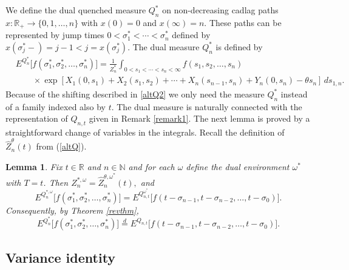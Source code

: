 \documentclass[11pt]{amsart}
\newtheorem{lemma}[theorem]{\sc Lemma}
\numberwithin{equation}{section}
\theoremstyle{remark}
\begin{document}
We define the dual quenched measure $Q^*_n$   on non-decreasing cadlag paths $x:{\mathbb{R}}_+\to \{0,1,\dots,n\}$ with $x(0)=0$ and $x(\infty)=n$. These paths can be represented by    jump times 
$0<\sigma^*_1<\dotsm<\sigma^*_{n}$ defined by $x(\sigma^*_j-)=j-1<j=x(\sigma^*_j)$.  The dual measure   $Q^*_n$  is defined by 
 \begin{equation}\label{Qstar}\begin{aligned} 
&E^{Q^*_{n}}\bigl[f(\sigma^*_1,\sigma^*_2,\dotsc,\sigma^*_{n})\bigr]  =\frac1{Z_n^*} 
\int_{0<s_1<\dotsm<s_n<\infty}  f(s_1, s_2,\dotsc, s_n)   \\[4pt]
&\qquad \times\exp\left[ X_1(0,s_1)+X_2(s_1,s_2)+\dotsm+ X_n(s_{n-1},s_{n})+Y_n(0,s_{n})-{\theta} s_{n}\right]
\,d{s_{1,n}}.  
\end{aligned}\end{equation}
Because of the shifting described in \eqref{altQ2} we only need 
the measure $Q^*_{n}$ instead of a family indexed also by $t$. 
 The dual measure is naturally connected  with the representation of  $Q_{n,t}$ given
 in Remark \ref{remark1}.   The    next lemma is proved by a straightforward  change of
 variables in the integrals.  {Recall the definition of $\widehat Z_n^{\theta}(t)$ from (\ref{altQ}).}
\begin{lemma}\label{LEMrev}  Fix $t\in{\mathbb{R}}$ and $n\in{\mathbb{N}}$  and for each
${\omega}$  define the dual environment ${\omega}^*$ 
with $T=t$.  
Then  $
Z_n^{*,{\omega}} =  \widehat Z_{n}^{{\theta}, {\omega}^*}(t), 
$
and 
\[  E^{Q^{*,{\omega}}_{n}}\bigl[f(\sigma^*_1,\sigma^*_2,\dotsc,\sigma^*_{n})  \bigr]
=    E^{Q_{n,t}^{{\omega}^*}}\bigl[ f(t-\sigma_{n-1},t-\sigma_{n-2},\dotsc,t-\sigma_{0})\bigr].    \]  
Consequently, by Theorem \ref{revthm}, 
\[
 E^{Q^{*}_{n}}\bigl[f(\sigma^*_1,\sigma^*_2,\dotsc,\sigma^*_{n}) \bigr]
   {\stackrel{d}{=}}   E^{Q_{n,t}}\bigl[f(t-\sigma_{n-1},t-\sigma_{n-2},\dotsc,t-\sigma_{0})\bigr].  
\]
 \end{lemma}

\subsection{Variance identity}
\end{document}
